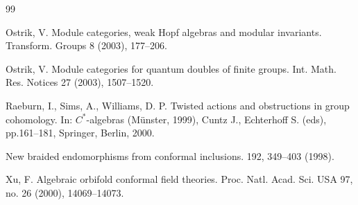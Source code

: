 \documentclass[12pt]{article}
\numberwithin{equation}{section}
\begin{document}
\begin{thebibliography}{99}
\begin{scriptsize}
 {Ostrik, V.} {Module categories, weak Hopf algebras and modular invariants.} Transform. Groups
8 (2003), 177--206.

 {Ostrik, V.} {Module categories for quantum doubles of finite groups.}
Int. Math. Res. Notices 27 (2003), 1507--1520.%


 {Raeburn, I., Sims, A., Williams, D. P.} {Twisted actions and obstructions in group cohomology.} {In: $C^*$-algebras (M\"unster, 1999),} Cuntz J., Echterhoff S. (eds), pp.161--181, Springer, Berlin, 2000. 



{New braided endomorphisms from conformal inclusions.} \CMP{} {192},
{349--403} {(1998)}.



 {Xu, F.}
{Algebraic orbifold conformal field theories.}  
Proc. Natl. Acad. Sci. USA 97, no. 26  (2000), 14069--14073. 


\end{scriptsize}

\end{thebibliography}
\end{document}
